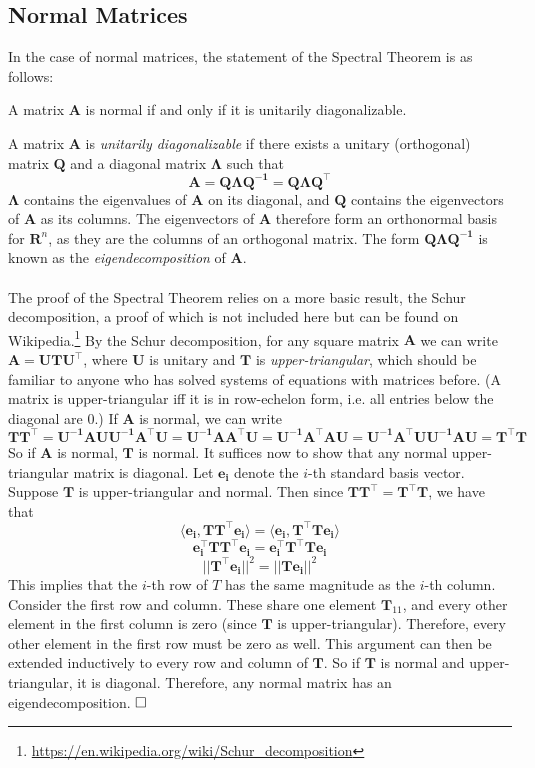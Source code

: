 \documentclass{article}
\begin{document}
\subsection{Normal Matrices}
In the case of normal matrices, the statement of the Spectral Theorem is as follows:
\begin{center}
A matrix $\mathbf{A}$ is normal if and only if it is unitarily diagonalizable.
\end{center}
A matrix $\mathbf{A}$ is \textit{unitarily diagonalizable} if there exists a unitary (orthogonal) matrix $\mathbf{Q}$ and a diagonal matrix $\mathbf{\Lambda}$ such that $$\mathbf{A} = \mathbf{Q\Lambda Q^{-1}} = \mathbf{Q\Lambda Q^{\top}}$$ $\mathbf{\Lambda}$ contains the eigenvalues of $\mathbf{A}$ on its diagonal, and $\mathbf{Q}$ contains the eigenvectors of $\mathbf{A}$ as its columns. The eigenvectors of $\mathbf{A}$ therefore form an orthonormal basis for $\mathbf{R}^n$, as they are the columns of an orthogonal matrix. The form $\mathbf{Q\Lambda Q^{-1}}$ is known as the \textit{eigendecomposition} of $\mathbf{A}$. \\\\
The proof of the Spectral Theorem relies on a more basic result, the Schur decomposition, a proof of which is not included here but can be found on Wikipedia.\footnote{\url{https://en.wikipedia.org/wiki/Schur_decomposition}} By the Schur decomposition, for any square matrix $\mathbf{A}$ we can write $\mathbf{A} = \mathbf{UTU^{\top}}$, where $\mathbf{U}$ is unitary and $\mathbf{T}$ is \textit{upper-triangular}, which should be familiar to anyone who has solved systems of equations with matrices before. (A matrix is upper-triangular iff it is in row-echelon form, i.e. all entries below the diagonal are 0.) If $\mathbf{A}$ is normal, we can write $$\mathbf{TT^{\top}} = \mathbf{U^{-1}AUU^{-1}A^{\top}U} = \mathbf{U^{-1}AA^{\top}U} = \mathbf{U^{-1}A^{\top}AU} = \mathbf{U^{-1}A^{\top}UU^{-1}AU} = \mathbf{T^{\top}T}$$ So if $\mathbf{A}$ is normal, $\mathbf{T}$ is normal. It suffices now to show that any normal upper-triangular matrix is diagonal. Let $\mathbf{e_i}$ denote the $i$-th standard basis vector. Suppose $\mathbf{T}$ is upper-triangular and normal. Then since $\mathbf{TT^{\top}} = \mathbf{T^{\top}T}$, we have that $$\langle \mathbf{e_i, TT^{\top}e_i} \rangle = \langle \mathbf{e_i, T^{\top}Te_i} \rangle$$ $$ \mathbf{e_i^{\top}TT^{\top}e_i} = \mathbf{e_i^{\top}T^{\top}Te_i}$$ $$||\mathbf{T^{\top}e_i}||^2 = ||\mathbf{Te_i}||^2$$ This implies that the $i$-th row of $T$ has the same magnitude as the $i$-th column. Consider the first row and column. These share one element $\mathbf{T}_{11}$, and every other element in the first column is zero (since $\mathbf{T}$ is upper-triangular). Therefore, every other element in the first row must be zero as well. This argument can then be extended inductively to every row and column of $\mathbf{T}$. So if $\mathbf{T}$ is normal and upper-triangular, it is diagonal. Therefore, any normal matrix has an eigendecomposition. $\hfill\square$\\
\end{document}
